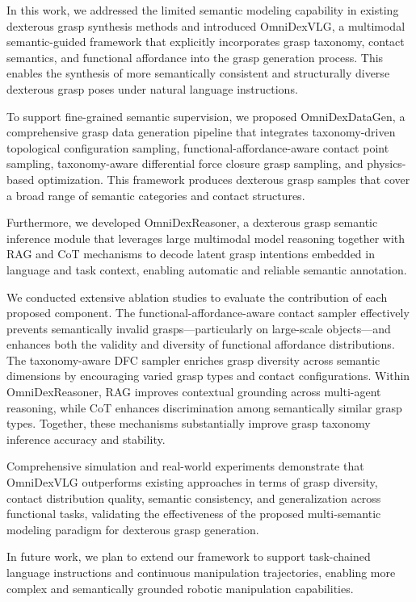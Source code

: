 In this work, we addressed the limited semantic modeling capability in existing dexterous grasp synthesis methods and introduced OmniDexVLG, a multimodal semantic-guided framework that explicitly incorporates grasp taxonomy, contact semantics, and functional affordance into the grasp generation process. 
This enables the synthesis of more semantically consistent and structurally diverse dexterous grasp poses under natural language instructions.

To support fine-grained semantic supervision, we proposed OmniDexDataGen, a comprehensive grasp data generation pipeline that integrates taxonomy-driven topological configuration sampling, functional-affordance-aware contact point sampling, taxonomy-aware differential force closure grasp sampling, and physics-based optimization. This framework produces dexterous grasp samples that cover a broad range of semantic categories and contact structures. 

Furthermore, we developed OmniDexReasoner, a dexterous grasp semantic inference module that leverages large multimodal model reasoning together with RAG and CoT mechanisms to decode latent grasp intentions embedded in language and task context, enabling automatic and reliable semantic annotation.

We conducted extensive ablation studies to evaluate the contribution of each proposed component. The functional-affordance-aware contact sampler effectively prevents semantically invalid grasps—particularly on large-scale objects—and enhances both the validity and diversity of functional affordance distributions. The taxonomy-aware DFC sampler enriches grasp diversity across semantic dimensions by encouraging varied grasp types and contact configurations. Within OmniDexReasoner, RAG improves contextual grounding across multi-agent reasoning, while CoT enhances discrimination among semantically similar grasp types. Together, these mechanisms substantially improve grasp taxonomy inference accuracy and stability.

Comprehensive simulation and real-world experiments demonstrate that OmniDexVLG outperforms existing approaches in terms of grasp diversity, contact distribution quality, semantic consistency, and generalization across functional tasks, validating the effectiveness of the proposed multi-semantic modeling paradigm for dexterous grasp generation.

In future work, we plan to extend our framework to support task-chained language instructions and continuous manipulation trajectories, enabling more complex and semantically grounded robotic manipulation capabilities.